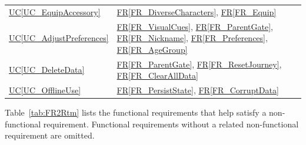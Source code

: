 \documentclass[12pt]{article}
\newcommand{\ucref}[1]{\hyperref[#1]{UC\ref*{#1}}}
\newcommand{\rref}[1]{\hyperref[#1]{FR\ref*{#1}}}
\begin{document}
\begin{longtable}{p{} p{}}
\ucref{UC_EquipAccessory} & \rref{FR_DiverseCharacters}, \rref{FR_Equip} \\
\ucref{UC_AdjustPreferences} & \rref{FR_VisualCues}, \rref{FR_ParentGate}, \rref{FR_Nickname}, \rref{FR_Preferences}, \rref{FR_AgeGroup} \\
\ucref{UC_DeleteData} & \rref{FR_ParentGate}, \rref{FR_ResetJourney}, \rref{FR_ClearAllData} \\
\ucref{UC_OfflineUse} & \rref{FR_PersistState}, \rref{FR_CorruptData} \\
\bottomrule
\end{longtable}

Table~\ref{tab:FR2Rtm} lists the functional requirements that help satisfy a
non-functional requirement. Functional requirements without a related
non-functional requirement are omitted.
\end{document}
